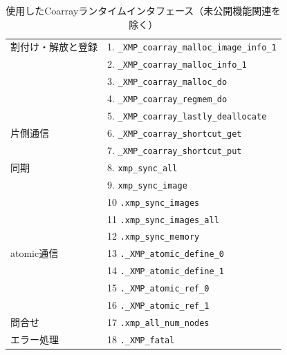 \begin{table}
 \begin{center}
  \caption{使用したCoarrayランタイムインタフェース（未公開機能関連を除く）}
  \begin{tabular}{|l|l|}
\hline
割付け・解放と登録
& 1. \verb|_XMP_coarray_malloc_image_info_1|\\
& 2. \verb|_XMP_coarray_malloc_info_1|\\
& 3. \verb|_XMP_coarray_malloc_do|\\
& 4. \verb|_XMP_coarray_regmem_do|\\
& 5. \verb|_XMP_coarray_lastly_deallocate|\\
\hline
片側通信
& 6. \verb|_XMP_coarray_shortcut_get|\\
& 7. \verb|_XMP_coarray_shortcut_put|\\
\hline
同期
& 8. \verb|xmp_sync_all|\\
& 9. \verb|xmp_sync_image|\\
& 10 \verb|.xmp_sync_images|\\
& 11 \verb|.xmp_sync_images_all|\\
& 12 \verb|.xmp_sync_memory|\\
\hline
atomic通信
& 13 \verb|._XMP_atomic_define_0|\\
& 14 \verb|._XMP_atomic_define_1|\\
& 15 \verb|._XMP_atomic_ref_0|\\
& 16 \verb|._XMP_atomic_ref_1|\\
\hline
問合せ
& 17 \verb|.xmp_all_num_nodes|\\
\hline
エラー処理
& 18 \verb|._XMP_fatal|\\
\hline
  \end{tabular}
 \end{center}
\end{table}

